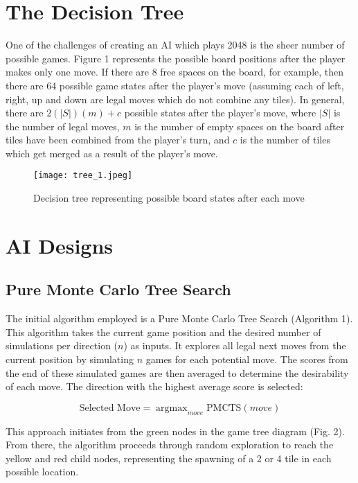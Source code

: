 \documentclass{article}
\DeclareMathOperator*{\argmax}{argmax}
\begin{document}
\section{The Decision Tree}

One of the challenges of creating an AI which plays 2048 is the sheer number of possible games.  Figure 1 represents the possible board positions after the player makes only one move.  If there are 8 free spaces on the board, for example, then there are 64 possible game states after the player's move (assuming each of left, right, up and down are legal moves which do not combine any tiles).  In general, there are $2(|S|)(m) + c$ possible states after the player's move, where $|S|$ is the number of legal moves,  $m$ is the number of empty spaces on the board after tiles have been combined from the player's turn, and $c$ is the number of tiles which get merged as a result of the player's move.

\begin{figure}[H]
\centering
\texttt{[image: tree\_1.jpeg]}
\caption{Decision tree representing possible board states after each move}
\label{fig:tree1}
\end{figure}

\section{AI Designs}
\subsection{Pure Monte Carlo Tree Search}
The initial algorithm employed is a Pure Monte Carlo Tree Search (Algorithm 1). This algorithm takes the current game position and the desired number of simulations per direction ($n$) as inputs. It explores all legal next moves from the current position by simulating $n$ games for each potential move. The scores from the end of these simulated games are then averaged to determine the desirability of each move. The direction with the highest average score is selected: 

\begin{equation}
\label{PMCTS_move_selection}
  \textrm{Selected Move} = \argmax_{move} \text{PMCTS}(move)
\end{equation}


This approach initiates from the green nodes in the game tree diagram (Fig. 2). From there, the algorithm proceeds through random exploration to reach the yellow and red child nodes, representing the spawning of a 2 or 4 tile in each possible location.
\end{document}
